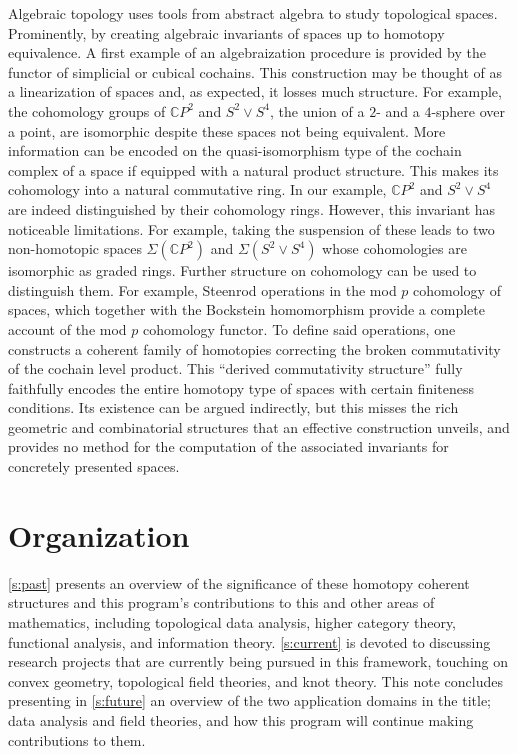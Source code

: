 Algebraic topology uses tools from abstract algebra to study topological spaces.
Prominently, by creating algebraic invariants of spaces up to homotopy equivalence.
A first example of an algebraization procedure is provided by the functor of simplicial or cubical cochains.
This construction may be thought of as a linearization of spaces and, as expected, it losses much structure.
For example, the cohomology groups of $\mathbb{C} P^2$ and $S^2 \vee S^4$, the union of a $2$- and a $4$-sphere over a point, are isomorphic despite these spaces not being equivalent.
More information can be encoded on the quasi-isomorphism type of the cochain complex of a space if equipped with a natural product structure.
This makes its cohomology into a natural commutative ring.
In our example, $\mathbb{C} P^2$ and $S^2 \vee S^4$ are indeed distinguished by their cohomology rings.
However, this invariant has noticeable limitations.
For example, taking the suspension of these leads to two non-homotopic spaces $\Sigma(\mathbb{C} P^2)$ and $\Sigma(S^2 \vee S^4)$ whose cohomologies are isomorphic as graded rings.
Further structure on cohomology can be used to distinguish them.
For example, Steenrod operations in the mod $p$ cohomology of spaces, which together with the Bockstein homomorphism provide a complete account of the mod $p$ cohomology functor.
To define said operations, one constructs a coherent family of homotopies correcting the broken commutativity of the cochain level product.
This ``derived commutativity structure'' fully faithfully encodes the entire homotopy type of spaces with certain finiteness conditions.
Its existence can be argued indirectly, but this misses the rich geometric and combinatorial structures that an effective construction unveils, and provides no method for the computation of the associated invariants for concretely presented spaces.

\section*{Organization}

\cref{s:past} presents an overview of the significance of these homotopy coherent structures and this program's contributions to this and other areas of mathematics, including topological data analysis, higher category theory, functional analysis, and information theory.
\cref{s:current} is devoted to discussing research projects that are currently being pursued in this framework, touching on convex geometry, topological field theories, and knot theory.
This note concludes presenting in \cref{s:future} an overview of the two application domains in the title; data analysis and field theories, and how this program will continue making contributions to them.

